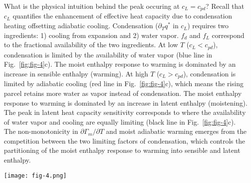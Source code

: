 \documentclass[]{ametsocV6.1}
\begin{document}
What is the physical intuition behind the peak occuring at $c_L = c_{pd}$? Recall that $c_L$ quantifies the enhancement of effective heat capacity due to condensation heating offsetting adiabatic cooling. Condensation ($\partial_T q^*$ in $c_L$) requires two ingredients: 1) cooling from expansion and 2) water vapor. $f_d$ and $f_L$ correspond to the fractional availability of the two ingredients. At low $T$ ($c_L < c_{pd}$), condensation is limited by the availability of water vapor (blue line in Fig.~\ref{fig:fig-4}c). The moist enthalpy response to warming is dominated by an increase in sensible enthalpy (warming). At high $T$ ($c_L > c_{pd}$), condensation is limited by adiabatic cooling (red line in Fig.~\ref{fig:fig-4}c), which means the rising parcel retains more water as vapor instead of condensation. The moist enthalpy response to warming is dominated by an increase in latent enthalpy (moistening). The peak in latent heat capacity sensitivity corresponds to where the availability of water vapor and cooling are equally limiting (black line in Fig.~\ref{fig:fig-4}c). The non-monotonicity in $\partial\Gamma_m/\partial T$ and moist adiabatic warming emerges from the competition between the two limiting factors of condensation, which controls the partitioning of the moist enthalpy response to warming into sensible and latent enthalpy.

\begin{figure*}[htbp]
 \centering
 \texttt{[image: fig-4.png]}\\
 \caption{The latent heat capacity sensitivity is decomposed into a product of four terms (Eq.~\ref{eq:term_b_intermediate}) that vary monotonically with local temperature $T$, where local means at pressure $p$. (a) The latent volume ratio $\tilde{\alpha}$ increases exponentially with $T$ (dashed) while the fractional change in latent heat capacity $c_L$ to a fractional change in $T$ decreases approximately linearly with $T$ (dotted). The product of the two is weakly non-monotonic with $T$ where the product has a local minimum (dash-dot). (b) The local minimum across the pressure-surface temperature space approximately occurs where $\tilde{\alpha}= R_v T / L_v$ (white line). (c) The latent fraction of effective heat capacity $f_L$ increases logistically with $T$ (blue line) while the sensible fraction $f_d$ decreases logistically with $T$ (red line). The product of the two is non-monotonic with $T$ where the product has a local maximum (purple line). (d) The $f_d\cdot f_L$ local maximum across the pressure-surface temperature space occurs where $c_L=c_{pd}$ (black line).}\label{fig:fig-4}
\end{figure*}
\end{document}
